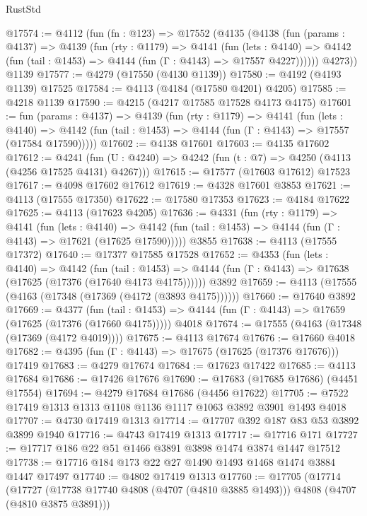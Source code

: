 \begin{lexlean}{RustStd}
\begin{coremodule}
@17574 := @4112
    (fun (fn : @123) =>
    @17552
      (@4135
        (@4138
          (fun (params : @4137) =>
          @4139
            (fun (rty : @1179) =>
            @4141
              (fun (lets : @4140) =>
              @4142 (fun (tail : @1453) => @4144 (fun (Γ : @4143) => @17557 @4227))))))
        @4273))
    @1139
@17577 := @4279 (@17550 (@4130 @1139))
@17580 := @4192 (@4193 @1139) @17525
@17584 := @4113 (@4184 (@17580 @4201) @4205)
@17585 := @4218 @1139
@17590 := @4215 (@4217 @17585 @17528 @4173 @4175)
@17601 := fun (params : @4137) =>
  @4139
    (fun (rty : @1179) =>
    @4141
      (fun (lets : @4140) =>
      @4142 (fun (tail : @1453) => @4144 (fun (Γ : @4143) => @17557 (@17584 @17590)))))
@17602 := @4138 @17601
@17603 := @4135 @17602
@17612 := @4241
    (fun (U : @4240) => @4242 (fun (t : @7) => @4250 (@4113 (@4256 @17525 @4131) @4267)))
@17615 := @17577 (@17603 @17612) @17523
@17617 := @4098 @17602 @17612
@17619 := @4328 @17601 @3853
@17621 := @4113 (@17555 @17350)
@17622 := @17580 @17353
@17623 := @4184 @17622
@17625 := @4113 (@17623 @4205)
@17636 := @4331
    (fun (rty : @1179) =>
    @4141
      (fun (lets : @4140) =>
      @4142 (fun (tail : @1453) => @4144 (fun (Γ : @4143) => @17621 (@17625 @17590)))))
    @3855
@17638 := @4113 (@17555 @17372)
@17640 := @17377 @17585 @17528
@17652 := @4353
    (fun (lets : @4140) =>
    @4142
      (fun (tail : @1453) =>
      @4144 (fun (Γ : @4143) => @17638 (@17625 (@17376 (@17640 @4173 @4175))))))
    @3892
@17659 := @4113 (@17555 (@4163 (@17348 (@17369 (@4172 (@3893 @4175))))))
@17660 := @17640 @3892
@17669 := @4377
    (fun (tail : @1453) => @4144 (fun (Γ : @4143) => @17659 (@17625 (@17376 (@17660 @4175)))))
    @4018
@17674 := @17555 (@4163 (@17348 (@17369 (@4172 @4019))))
@17675 := @4113 @17674
@17676 := @17660 @4018
@17682 := @4395 (fun (Γ : @4143) => @17675 (@17625 (@17376 @17676))) @17419
@17683 := @4279 @17674
@17684 := @17623 @17422
@17685 := @4113 @17684
@17686 := @17426 @17676
@17690 := @17683 (@17685 @17686) (@4451 @17554)
@17694 := @4279 @17684 @17686 (@4456 @17622)
@17705 := @7522 @17419 @1313 @1313 @1108 @1136 @1117 @1063 @3892 @3901 @1493 @4018
@17707 := @4730 @17419 @1313
@17714 := @17707 @392 @187 @83 @53 @3892 @3899 @1940
@17716 := @4743 @17419 @1313
@17717 := @17716 @171
@17727 := @17717 @186 @22 @51 @1466 @3891 @3898 @1474 @3874 @1447 @17512
@17738 := @17716 @184 @173 @22 @27 @1490 @1493 @1468 @1474 @3884 @1447 @17497
@17740 := @4802 @17419 @1313
@17760 := @17705
    (@17714
      (@17727 (@17738 @17740 @4808 (@4707 (@4810 @3885 @1493))) @4808 (@4707 (@4810 @3875 @3891)))

\end{coremodule}
\end{lexlean}
